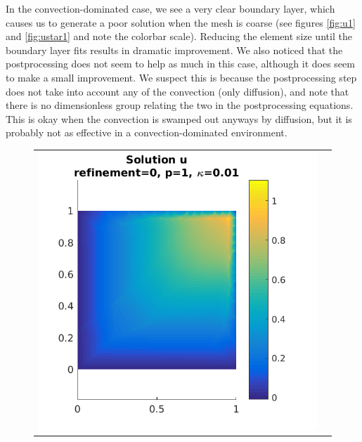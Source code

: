\documentclass{article}
\begin{document}
In the convection-dominated case, we see a very clear boundary layer, which causes us to generate a poor solution when the mesh is coarse (see figures \ref{fig:u1} and \ref{fig:ustar1} and note the colorbar scale).
Reducing the element size until the boundary layer fits results in dramatic improvement.
We also noticed that the postprocessing does not seem to help as much in this case, although it does seem to make a small improvement.
We suspect this is because the postprocessing step does not take into account any of the convection (only diffusion), and note that there is no dimensionless group relating the two in the postprocessing equations.
This is okay when the convection is swamped out anyways by diffusion, but it is probably not as effective in a convection-dominated environment.

\begin{figure}[!ht]
\centering
\begin{tabular}{c c}
\includegraphics[scale=0.7]{umu_113.png} & 

\end{tabular}
\end{figure}
\end{document}
